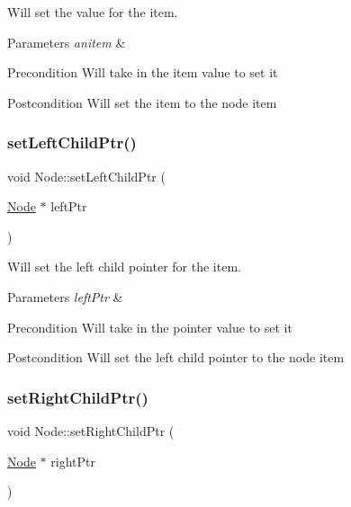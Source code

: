 Will set the value for the item. 


\begin{DoxyParams}{Parameters}
{\em anitem} & \\
\hline
\end{DoxyParams}
\begin{DoxyPrecond}{Precondition}
Will take in the item value to set it 
\end{DoxyPrecond}
\begin{DoxyPostcond}{Postcondition}
Will set the item to the node item 
\end{DoxyPostcond}
\mbox{\label{class_node_a4da6acb58d5b8f60bc7ac822250cda32}} 
\subsubsection{\texorpdfstring{set\+Left\+Child\+Ptr()}{setLeftChildPtr()}}
{\footnotesize\ttfamily void Node\+::set\+Left\+Child\+Ptr (\begin{DoxyParamCaption}\item[{\mbox{\hyperlink{class_node}{Node}} $\ast$}]{left\+Ptr }\end{DoxyParamCaption})}



Will set the left child pointer for the item. 


\begin{DoxyParams}{Parameters}
{\em left\+Ptr} & \\
\hline
\end{DoxyParams}
\begin{DoxyPrecond}{Precondition}
Will take in the pointer value to set it 
\end{DoxyPrecond}
\begin{DoxyPostcond}{Postcondition}
Will set the left child pointer to the node item 
\end{DoxyPostcond}
\mbox{\label{class_node_a7e4994f0037bcc6b52a568de0c0a8acf}} 
\subsubsection{\texorpdfstring{set\+Right\+Child\+Ptr()}{setRightChildPtr()}}
{\footnotesize\ttfamily void Node\+::set\+Right\+Child\+Ptr (\begin{DoxyParamCaption}\item[{\mbox{\hyperlink{class_node}{Node}} $\ast$}]{right\+Ptr }\end{DoxyParamCaption})}



